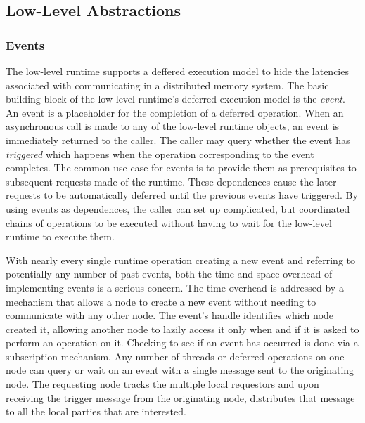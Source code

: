 \subsection{Low-Level Abstractions}
\label{subsec:lowobjects}
\subsubsection{Events}
\label{subsec:events}
The low-level runtime supports a deffered execution model to hide
the latencies associated with communicating in a distributed memory
system.  The basic building block of the low-level runtime's deferred execution model
is the {\em event}.  An event is a placeholder for the completion of a deferred
operation.  When an asynchronous call is made to any of the low-level runtime objects, an event is 
immediately returned to the caller.  The caller may query whether the event has {\em triggered}
which happens when the operation corresponding to the event completes.  The common use case for events is
to provide them as prerequisites to subsequent requests made of the runtime. 
These dependences cause the later requests to be automatically deferred until the previous
events have triggered.  By using events as dependences, the caller can
set up complicated, but coordinated chains of operations to be executed without
having to wait for the low-level runtime to execute them.

With nearly every single runtime operation creating a new event and referring
to potentially any number of past events, both the time and space overhead of
implementing events is a serious concern.  The time overhead is addressed by a
mechanism that allows a node to create a new event without needing to
communicate with any other node.  The event's handle identifies which node
created it, allowing another node to lazily access it only when and if it 
is asked to perform an operation on it.  Checking to see if an event has
occurred is done via a subscription mechanism.  Any number of threads or
deferred operations on one node can query or wait on an event with a single
message sent to the originating node.  The requesting node tracks the multiple
local requestors and upon receiving the trigger message from the originating
node, distributes that message to all the local parties that are interested.


